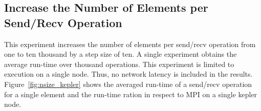 \subsection*{Increase the Number of Elements per Send/Recv Operation}
This experiment increases the number of elements per send/recv
operation from one to ten thousand by a step size of ten. A single experiment
obtains the average run-time over thousand operations.  This experiment is
limited to execution on a single node. Thus, no network latency is
included in the results. Figure~\ref{fig:nsize_kepler} shows the
averaged run-time of a send/recv operation for a single element and
the run-time ration in respect to MPI on a single kepler node.



